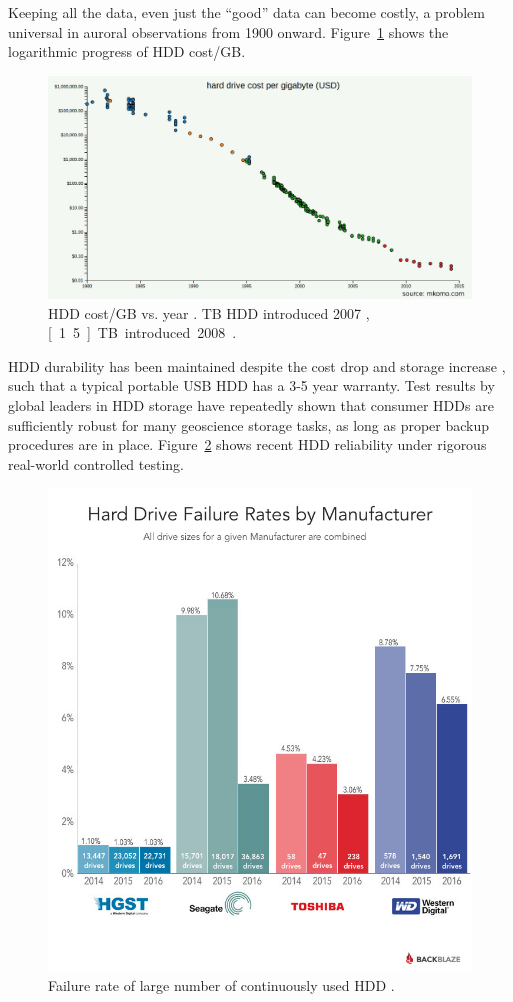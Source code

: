 Keeping all the data, even just the ``good'' data can become costly, a problem universal in auroral observations from 1900 onward.
Figure~\ref{fig:hddcost} shows the logarithmic progress of HDD cost/GB.
\begin{figure}
    \includegraphics[width=\linewidth]{gfx/hdd-cost-per-gigabyte-large}
    \caption{HDD cost/GB vs. year \citep{hddcost}. \unit[1]{TB} HDD introduced 2007 \citep{first1tb}, \unit[1.5]{TB} introduced 2008 \citep{firsthdd}.}\label{fig:hddcost}
\end{figure}
HDD durability has been maintained despite the cost drop and storage increase  , such that a typical portable USB HDD has a 3-5 year warranty. 
Test results by global leaders in HDD storage have repeatedly shown that consumer HDDs are sufficiently robust for many geoscience storage tasks, as long as proper backup procedures are in place.
Figure~\ref{fig:hddreliability} shows recent HDD reliability under rigorous real-world controlled testing.
\begin{figure}
    \includegraphics[width=\linewidth]{gfx/drive-stats-2016-q1-failure-by-mfg}
    \caption{Failure rate of large number of continuously used HDD \citep{backblaze2016}.}\label{fig:hddreliability}
\end{figure}
